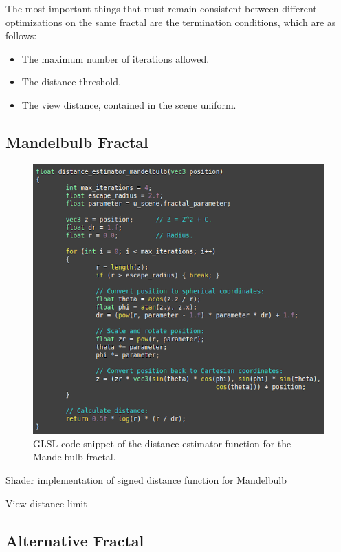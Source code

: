The most important things that must remain consistent between different optimizations on the same fractal are the termination conditions, which are as follows:

\begin{itemize}
	\item The maximum number of iterations allowed.
	\item The distance threshold.
	\item The view distance, contained in the scene uniform.
\end{itemize}

\subsection{Mandelbulb Fractal}

\begin{figure}[ht]
	\centering
	\includegraphics[width=0.65\linewidth, frame]{Images/GLSL-Distance-Estimator-Mandelbulb.png}
	\caption{GLSL code snippet of the distance estimator function for the Mandelbulb fractal.}
	\label{figure:glsl-distance-estimator-mandelbulb}
\end{figure}

Shader implementation of signed distance function for Mandelbulb

View distance limit

\subsection{Alternative Fractal}

